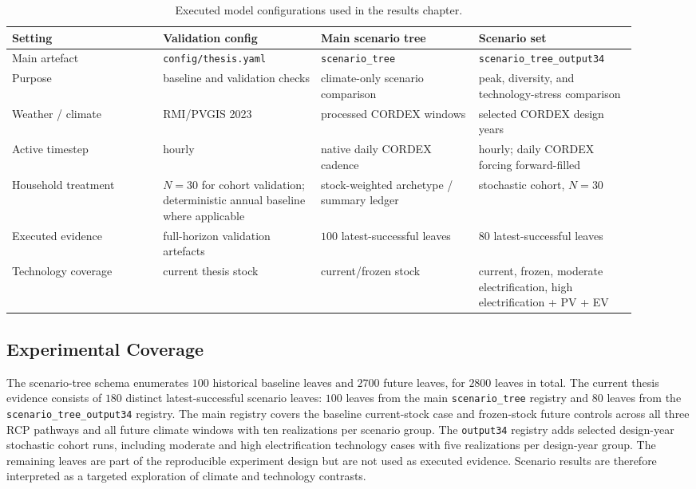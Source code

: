 \begin{table}[ht]
  \centering
  \footnotesize
  \caption{Executed model configurations used in the results chapter.}
  \label{tab:canonical_configurations}
  \begin{tabular}{@{}p{0.22\linewidth} p{0.23\linewidth}
                  p{0.23\linewidth} p{0.23\linewidth}@{}}
    \toprule
    \textbf{Setting} & \textbf{Validation config}
      & \textbf{Main scenario tree} & \textbf{Scenario set} \\
    \midrule
    Main artefact
      & \texttt{config/thesis.yaml}
      & \texttt{scenario\_tree}
      & \texttt{scenario\_tree\_output34} \\
    Purpose
      & baseline and validation checks
      & climate-only scenario comparison
      & peak, diversity, and technology-stress comparison \\
    Weather / climate
      & RMI/PVGIS 2023
      & processed CORDEX windows
      & selected CORDEX design years \\
    Active timestep
      & hourly
      & native daily CORDEX cadence
      & hourly; daily CORDEX forcing forward-filled \\
    Household treatment
      & $N=30$ for cohort validation; deterministic annual baseline where applicable
      & stock-weighted archetype / summary ledger
      & stochastic cohort, $N=30$ \\
    Executed evidence
      & full-horizon validation artefacts
      & $100$ latest-successful leaves
      & $80$ latest-successful leaves \\
    Technology coverage
      & current thesis stock
      & current/frozen stock
      & current, frozen, moderate electrification, high electrification + PV + EV \\
    \bottomrule
  \end{tabular}
\end{table}

\subsection{Experimental Coverage}
\label{sec:experimentalCoverage}

The scenario-tree schema enumerates $100$ historical baseline leaves and
$2700$ future leaves, for $2800$ leaves in total. The current thesis evidence consists of $180$ distinct latest-successful scenario leaves: $100$ leaves from the main \texttt{scenario\_tree} registry and $80$ leaves from the \texttt{scenario\_tree\_output34} registry. The main registry covers the baseline current-stock case and frozen-stock future controls across all three RCP pathways and all future climate windows with ten realizations per scenario group. The \texttt{output34} registry adds selected design-year stochastic cohort runs, including moderate and high electrification technology cases with five realizations per design-year group.
\newline The remaining leaves are part of the reproducible experiment design but are not used as executed evidence. Scenario results are therefore interpreted as a targeted exploration of climate and technology contrasts.

